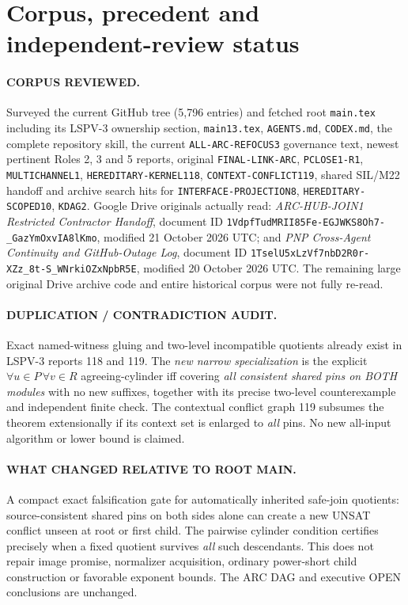 \documentclass[11pt]{article}
\begin{document}
\section{Corpus, precedent and independent-review status}
\paragraph{CORPUS REVIEWED.}
Surveyed the current GitHub tree (5,796 entries) and fetched
root \texttt{main.tex} including its LSPV-3 ownership section,
\texttt{main13.tex}, \texttt{AGENTS.md}, \texttt{CODEX.md},
the complete repository skill, the current
\texttt{ALL-ARC-REFOCUS3} governance text, newest pertinent
Roles 2, 3 and 5 reports, original
\texttt{FINAL-LINK-ARC}, \texttt{PCLOSE1-R1},
\texttt{MULTICHANNEL1}, \texttt{HEREDITARY-KERNEL118},
\texttt{CONTEXT-CONFLICT119}, shared SIL/M22 handoff
and archive search hits for
\texttt{INTERFACE-PROJECTION8}, \texttt{HEREDITARY-SCOPED10},
\texttt{KDAG2}. Google Drive originals actually read:
\emph{ARC-HUB-JOIN1 Restricted Contractor Handoff},
document ID \texttt{1VdpfTudMRII85Fe-EGJWKS8Oh7-\_GazYmOxvIA8lKmo},
modified 21 October 2026 UTC;
and \emph{PNP Cross-Agent Continuity and GitHub-Outage Log},
document ID \texttt{1TselU5xLzVf7nbD2R0r-XZz\_8t-S\_WNrkiOZxNpbR5E},
modified 20 October 2026 UTC.
The remaining large original Drive archive code and entire
historical corpus were not fully re-read.

\paragraph{DUPLICATION / CONTRADICTION AUDIT.}
Exact named-witness gluing and two-level incompatible quotients
already exist in LSPV-3 reports 118 and 119.
The \emph{new narrow specialization} is the explicit
$\forall u\in P\,\forall v\in R$ agreeing-cylinder iff
covering \emph{all consistent shared pins on BOTH modules}
with no new suffixes, together with its precise two-level
counterexample and independent finite check.
The contextual conflict graph 119 subsumes the theorem
extensionally if its context set is enlarged to \emph{all}
pins. No new all-input algorithm or lower bound is claimed.

\paragraph{WHAT CHANGED RELATIVE TO ROOT MAIN.}
A compact exact falsification gate for automatically inherited
safe-join quotients: source-consistent shared pins on both sides
alone can create a new UNSAT conflict unseen at root or first
child. The pairwise cylinder condition certifies precisely when
a fixed quotient survives \emph{all} such descendants. This
does not repair image promise, normalizer acquisition, ordinary
power-short child construction or favorable exponent bounds.
The ARC DAG and executive OPEN conclusions are unchanged.
\end{document}
